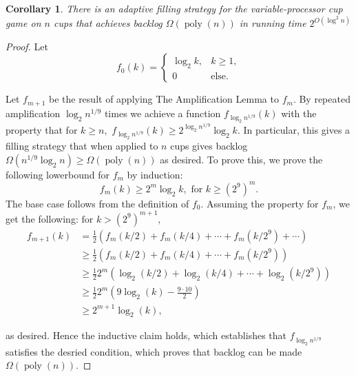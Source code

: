 \documentclass[twocolumn]{article}[11pt]
\DeclareMathOperator{\poly}{\text{poly}}
\newtheorem{corollary}{Corollary}
\begin{document}
\begin{corollary}
  There is an adaptive filling strategy for the variable-processor cup game on $n$ cups that achieves backlog $\Omega(\poly(n))$ in running time $2^{O(\log^2 n)}$
\end{corollary}
\begin{proof}
  Let
  $$f_0(k) = 
  \begin{cases} 
    \log_2 k, & k\geq 1, \\
    0 & \text{else.}
  \end{cases}$$

  Let $f_{m+1} $ be the result of applying The Amplification Lemma to $f_m$. 
  By repeated amplification $\log_2 n^{1/9}$ times we 
  achieve a function $f_{\log_2 n^{1/9}}(k)$ with the property that for $k \geq n,$
  $f_{\log_2 n^{1/9}}(k) \geq 2^{\log_2 n^{1/9}} \log_2 k$. In particular, this gives a filling strategy 
  that when applied to $n$ cups gives backlog $\Omega(n^{1/9}\log_2 n) \ge \Omega(\poly(n))$ as desired.
  To prove this, we prove the following lowerbound for $f_m$ by induction:
  $$f_m(k) \geq 2^m \log_2 k, \text{ for } k \geq (2^9)^m.$$
  The base case follows from the definition of $f_0$. Assuming the property for $f_m$, we get the following:
  $ \text{for } k > (2^9)^{m+1},$
  \begin{align*}
    f_{m+1}(k) &= \frac{1}{2}(f_m(k/2) + f_m(k/4) + \cdots + f_m(k/2^9) + \cdots)\\
  &\geq \frac{1}{2}(f_m(k/2) + f_m(k/4) + \cdots + f_m(k/2^9))\\
  &\geq \frac{1}{2}2^m(\log_2 (k/2) + \log_2(k/4) + \cdots + \log_2(k/2^9))\\
  &\geq \frac{1}{2}2^m(9\log_2 (k) - \frac{9 \cdot 10}{2}) \\
  &\geq 2^{m+1} \log_2(k) ,
  \end{align*}

  as desired. Hence the inductive claim holds, which establishes that $f_{\log_2
  n^{1/9}}$ satisfies the desried condition, which proves that backlog can be
  made $\Omega(\poly(n))$.


\end{proof}













\end{document}
